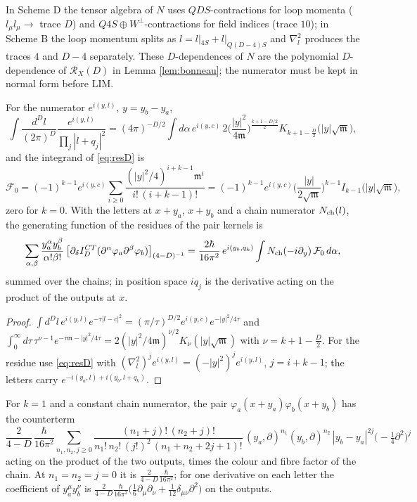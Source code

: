 \begin{remark}
In Scheme D the tensor algebra of $N$ uses $QDS$-contractions for loop momenta ($l_\mu l_\mu\to$ trace $D$) and $Q4S\oplus W^\perp$-contractions for field indices (trace $10$); in Scheme B the loop momentum splits as $l=l|_{4S}+l|_{Q(D-4)S}$ and $\nabla^2_l$ produces the traces $4$ and $D-4$ separately. These $D$-dependences of $N$ are the polynomial $D$-dependence of $\mathcal R_X(D)$ in Lemma \ref{lem:bonneau}; the numerator must be kept in normal form before $\mathrm{LIM}$.
\end{remark}

\begin{proposition}
\label{prop:genD}
For the numerator $e^{i(y,l)}$, $y=y_b-y_a$,
\[
\int\frac{d^Dl}{(2\pi)^D}\frac{e^{i(y,l)}}{\prod_j|l+q_j|^2}=(4\pi)^{-D/2}\int d\alpha\,e^{i(y,c)}\,2\Big(\frac{|y|^2}{4\mathfrak m}\Big)^{\frac{k+1-D/2}2}K_{k+1-\frac D2}\big(|y|\sqrt{\mathfrak m}\big),
\]
and the integrand of \eqref{eq:resD} is
\[
\mathcal F_0=(-1)^{k-1}e^{i(y,c)}\sum_{i\ge0}\frac{(|y|^2/4)^{i+k-1}\mathfrak m^i}{i!\,(i+k-1)!}=(-1)^{k-1}e^{i(y,c)}\Big(\frac{|y|}{2\sqrt{\mathfrak m}}\Big)^{k-1}I_{k-1}\big(|y|\sqrt{\mathfrak m}\big),
\]
zero for $k=0$. With the letters at $x+y_a$, $x+y_b$ and a chain numerator $N_{\rm ch}(l)$, the generating function of the residues of the pair kernels is
\[
\sum_{\alpha,\beta}\frac{y_a^\alpha y_b^\beta}{\alpha!\beta!}\,\big[\partial_\delta I^{CT}_D(\partial^\alpha\varphi_a\partial^\beta\varphi_b)\big]_{(4-D)^{-1}}=\frac{2\hbar}{16\pi^2}\,e^{i(y_b,q_k)}\int N_{\rm ch}(-i\partial_y)\,\mathcal F_0\,d\alpha,
\]
summed over the chains; in position space $iq_j$ is the derivative acting on the product of the outputs at $x$.
\end{proposition}

\begin{proof}
$\int d^Dl\,e^{i(y,l)}e^{-\tau|l-c|^2}=(\pi/\tau)^{D/2}e^{i(y,c)}e^{-|y|^2/4\tau}$ and $\int_0^\infty d\tau\,\tau^{\nu-1}e^{-\tau\mathfrak m-|y|^2/4\tau}=2(|y|^2/4\mathfrak m)^{\nu/2}K_\nu(|y|\sqrt{\mathfrak m})$ with $\nu=k+1-\frac D2$. For the residue use \eqref{eq:resD} with $(\nabla^2_l)^je^{i(y,l)}=(-|y|^2)^je^{i(y,l)}$, $j=i+k-1$; the letters carry $e^{-i(y_a,l)+i(y_b,l+q_k)}$.
\end{proof}

\begin{corollary}
\label{cor:bubble}
For $k=1$ and a constant chain numerator, the pair $\varphi_a(x+y_a)\varphi_b(x+y_b)$ has the counterterm
\[
\frac{2}{4-D}\,\frac{\hbar}{16\pi^2}\sum_{n_1,n_2,j\ge0}\frac{(n_1+j)!\,(n_2+j)!}{n_1!\,n_2!\,(j!)^2\,(n_1+n_2+2j+1)!}\,(y_a,\partial)^{n_1}(y_b,\partial)^{n_2}\,|y_b-y_a|^{2j}\big(-\tfrac14\partial^2\big)^j
\]
acting on the product of the two outputs, times the colour and fibre factor of the chain. At $n_1=n_2=j=0$ it is $\frac2{4-D}\frac{\hbar}{16\pi^2}$; for one derivative on each letter the coefficient of $y_a^\mu y_b^\nu$ is $\frac{2}{4-D}\frac{\hbar}{16\pi^2}\big(\frac16\partial_\mu\partial_\nu+\frac1{12}\delta_{\mu\nu}\partial^2\big)$ on the outputs.
\end{corollary}

